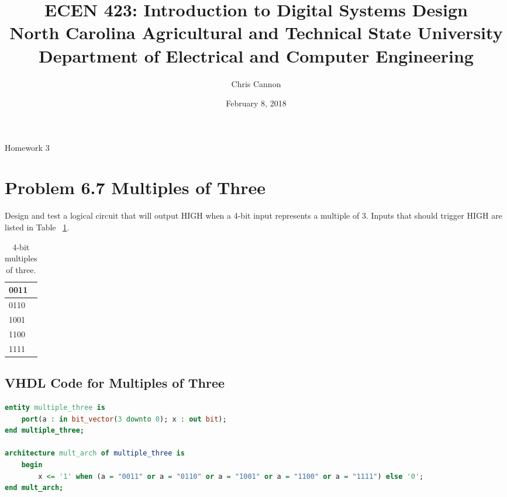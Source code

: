 \documentclass[11pt]{article}
\title {ECEN 423: Introduction to Digital Systems Design \\ North Carolina Agricultural and Technical State University \\ Department of Electrical and Computer Engineering} %
\author{Chris Cannon} %
\date{February 8, 2018}
\begin{document}
	
\maketitle

\begin{center}
	Homework 3
\end{center}


\section{Problem 6.7 Multiples of Three}
Design and test a logical circuit that will output HIGH when a 4-bit input represents a multiple of 3. Inputs that should trigger HIGH are listed in Table ~\ref{tab:multThree}.

\begin{table}
\begin{center}
	\begin{tabular}{| l |}
		\hline
		0011 \\ \hline
		0110 \\ \hline
		1001 \\ \hline
		1100 \\ \hline
		1111 \\ \hline
	\end{tabular}
	\caption{\label{tab:multThree}4-bit multiples of three.}
\end{center}	
\end{table}

\subsection{VHDL Code for Multiples of Three}

\begin{lstlisting}[language=VHDL]
entity multiple_three is
	port(a : in bit_vector(3 downto 0); x : out bit);
end multiple_three;

architecture mult_arch of multiple_three is
	begin
		x <= '1' when (a = "0011" or a = "0110" or a = "1001" or a = "1100" or a = "1111") else '0';
end mult_arch;
\end{lstlisting}
\end{document}
